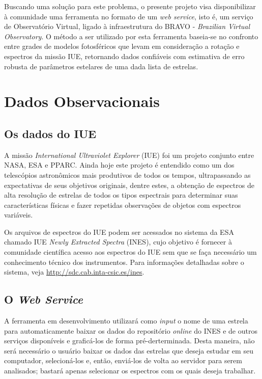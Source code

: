 \documentclass[letterpaper,10pt,english]{sphinxmanual}
\begin{document}
Buscando uma solução para este problema, o presente projeto visa disponibilizar à comunidade uma ferramenta no formato de um \emph{web service}, isto é, um serviço de Observatório Virtual, ligado à infraestrutura do BRAVO - \emph{Brazilian Virtual Observatory}. O método a ser utilizado por esta ferramenta baseia-se no confronto entre grades de modelos fotosféricos que levam em consideração a rotação e espectros da missão IUE, retornando dados confiáveis com estimativa de erro robusta de parâmetros estelares de uma dada lista de estrelas.


\chapter{Dados Observacionais}
\label{index:dados-observacionais}

\section{Os dados do IUE}
\label{index:os-dados-do-iue}
A missão \emph{International Ultraviolet Explorer} (IUE) foi um projeto conjunto entre NASA, ESA e PPARC. Ainda hoje este projeto é entendido como um dos telescópios astronômicos mais produtivos de todos os tempos, ultrapassando as expectativas de seus objetivos originais, dentre estes, a obtenção de espectros de alta resolução de estrelas de todos os tipos espectrais para determinar suas características físicas e fazer repetidas observações de objetos com espectros variáveis.

Os arquivos de espectros do IUE podem ser acessados no sistema da ESA chamado IUE \emph{Newly Extracted Spectra} (INES), cujo objetivo é fornecer à comunidade científica acesso aos espectros do IUE sem que se faça necessário um conhecimento técnico dos instrumentos. Para informações detalhadas sobre o sistema, veja \href{http://sdc.cab.inta-csic.es/ines}{http://sdc.cab.inta-csic.es/ines}.


\section{O \emph{Web Service}}
\label{index:o-web-service}
A ferramenta em desenvolvimento utilizará como \emph{input} o nome de uma estrela para automaticamente baixar os dados do repositório \emph{online} do INES e de outros serviços disponíveis e graficá-los de forma pré-derterminada. Desta maneira, não será necessário o usuário baixar os dados das estrelas que deseja estudar em seu computador, selecioná-los e, então, enviá-los de volta ao servidor para serem analisados; bastará apenas selecionar os espectros com os quais deseja trabalhar.
\end{document}
